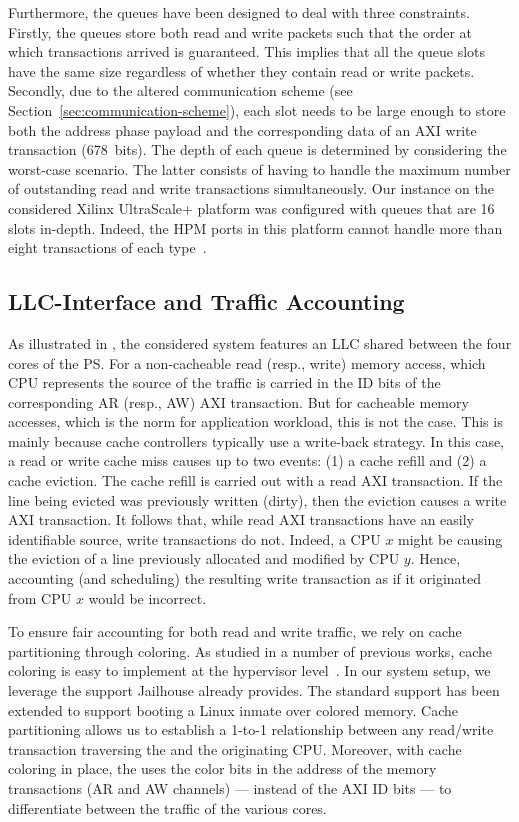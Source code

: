 Furthermore, the queues have been designed to deal with three
constraints.  Firstly, the queues store both read and write packets
such that the order at which transactions arrived is guaranteed. This
implies that all the queue slots have the same size regardless of
whether they contain read or write packets.  Secondly, due to the
altered communication scheme (see
Section~\ref{sec:communication-scheme}), each slot needs to be large
enough to store both the address phase payload and the corresponding
data of an AXI write transaction (678~bits). The depth of each queue
is determined by considering the worst-case scenario. The latter
consists of having to handle the maximum number of
outstanding read and write transactions simultaneously. Our \schim instance on the
considered Xilinx UltraScale+ platform was configured with queues that
are 16 slots in-depth. Indeed, the HPM ports in this platform cannot
handle more than eight transactions of each
type~\cite{Xilinx-ULTRASCALE-TRM}.

\subsection{LLC-\schim Interface and Traffic Accounting}
\label{sec:traffic-accounting}
As illustrated in , the considered system
features an LLC shared between the four cores of the PS. For a
non-cacheable read (resp., write) memory access, which CPU represents
the source of the traffic is carried in the ID bits of the
corresponding AR (resp., AW) AXI transaction. But for cacheable memory
accesses, which is the norm for application workload, this is not the
case. This is mainly because cache controllers typically use a
write-back strategy. In this case, a read or write cache miss causes
up to two events: (1) a cache refill and (2) a cache eviction. The
cache refill is carried out with a read AXI transaction. If the line
being evicted was previously written (dirty), then the eviction causes
a write AXI transaction. It follows that, while read AXI transactions
have an easily identifiable source, write transactions do not. Indeed,
a CPU $x$ might be causing the eviction of a line previously allocated
and modified by CPU $y$. Hence, accounting (and scheduling) the
resulting write transaction as if it originated from CPU $x$ would be
incorrect.

To ensure fair accounting for both read and write traffic, we rely on
cache partitioning through coloring. As studied in a number of
previous works, cache coloring is easy to implement at the hypervisor
level~\cite{xvisor2018, cachepart, determ_virt}. In our system setup,
we leverage the support Jailhouse already provides. The standard
support has been extended to support booting a Linux inmate over
colored memory. Cache partitioning allows us to establish a 1-to-1
relationship between any read/write transaction traversing the \schim
and the originating CPU. Moreover, with cache coloring in place, the
\schim uses the color bits in the address of the memory transactions
(AR and AW channels) --- instead of the AXI ID bits --- to
differentiate between the traffic of the various cores.


